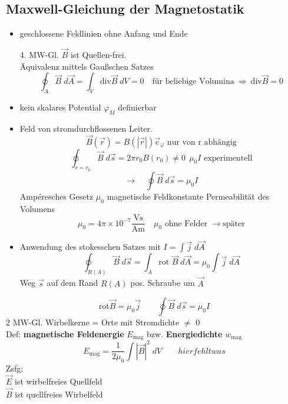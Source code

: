 \documentclass[titlepage,12pt,a4paper,ngerman]{report}
\newcommand{\tx}[1]{\textrm{#1}}
\begin{document}
\subsection{Maxwell-Gleichung der Magnetostatik}
\begin{itemize}
	\item geschlossene Feldlinien ohne Anfang und Ende\\
	\begin{center}
		\fbox{
			$\begin{array}{c}
			\tx{div } \vec{B}=0 \\
			\Phi_M = \oint_A \vec{B}\; d \vec{A}
			\end{array}$
		}
	\end{center}
	4. MW-Gl. $\vec{B}$ ist Quellen-frei.\\[5pt]
	Äquivalenz mittels Gaußschen Satzes
	$$\oint_A \vec{B}\; d \vec{A} = \int_V \tx{div} \vec{B}\; dV =0 \quad \tx{für beliebige Volumina}\ \Rightarrow \ \tx{div} \vec{B} =0$$
	\item kein skalares Potential $\varphi_M$ definierbar
	\item Feld von stromdurchflossenen Leiter. 
	$$\vec{B}(\vec{r})=B(|\vec{r}|) \vec{e}_\varphi \tx{ nur von r abhängig}$$
	$$\oint_{r=r_0}\vec{B}\;d\vec{s} = 2 \pi r_0 B(r_0) \neq 0 \ \  \mu_0 I \tx{ experimentell}$$
	$$\boxed{ \rightarrow \quad \oint\vec{B}\; d\vec{s}=\mu_0 I}$$ Ampéresches Gesetz $\mu_0$ magnetische Feldkonstante Permeabilität des Volumens
	$$\mu_0 = 4 \pi \times 10^{-7} \frac{\tx{Vs}}{\tx{Am}} \quad \mu_0 \tx{ ohne Felder } \rightarrow \tx{später}$$
	\item Anwendung des stokesschen Satzes mit $I= \int \vec{j} \; d \vec{A}$
	$$\oint_{R(A)}\vec{B} \; d\vec{s} = \int_A \tx{rot }\vec{B} \; d\vec{A} = \mu_0 \int \vec{j} \; d\vec{A}$$ 
	Weg $ \vec{s} $ auf dem Rand $ R(A) $ pos. Schraube um $ \vec{A} $
\end{itemize}
$$\boxed{\tx{rot} \vec{B} = \mu _0 \vec{j} \qquad \oint \vec{B} \; d \vec{s} = \mu _0 I}$$
2 MW-Gl. Wirbelkerne = Orte mit Stromdichte $\neq$ 0\\[5pt]
Def: \textbf{magnetische Feldenergie} $ E_{\tx{mag}} $ bzw. \textbf{Energiedichte} $ w_{\tx{mag}} $ 
$$ E_{\tx{mag}} = \frac{1}{2 \mu _0} \int|\vec{B}|^2 \; dV \qquad  hier fehlt was$$
Zsfg:\\
$ \vec{E} $ ist wirbelfreies Quellfeld\\
$ \vec{B} $ ist quellfreies Wirbelfeld
\end{document}
